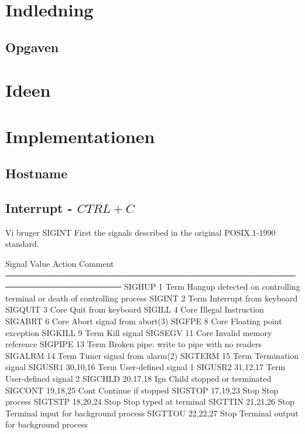 \documentclass{article}
\begin{document}

\tableofcontents
\pagebreak

\section{Indledning}

\subsection{Opgaven}

\section{Ideen}

\section{Implementationen}
\subsection{Hostname}

\subsection{Interrupt - $CTRL + C$}
Vi bruger SIGINT
 First the signals described in the original POSIX.1-1990 standard.

       Signal     Value     Action   Comment
       ──────────────────────────────────────────────────────────────────────
       SIGHUP        1       Term    Hangup detected on controlling terminal
                                     or death of controlling process
       SIGINT        2       Term    Interrupt from keyboard
       SIGQUIT       3       Core    Quit from keyboard
       SIGILL        4       Core    Illegal Instruction
       SIGABRT       6       Core    Abort signal from abort(3)
       SIGFPE        8       Core    Floating point exception
       SIGKILL       9       Term    Kill signal
       SIGSEGV      11       Core    Invalid memory reference
       SIGPIPE      13       Term    Broken pipe: write to pipe with no
                                     readers
       SIGALRM      14       Term    Timer signal from alarm(2)
       SIGTERM      15       Term    Termination signal
       SIGUSR1   30,10,16    Term    User-defined signal 1
       SIGUSR2   31,12,17    Term    User-defined signal 2
       SIGCHLD   20,17,18    Ign     Child stopped or terminated
       SIGCONT   19,18,25    Cont    Continue if stopped
       SIGSTOP   17,19,23    Stop    Stop process
       SIGTSTP   18,20,24    Stop    Stop typed at terminal
       SIGTTIN   21,21,26    Stop    Terminal input for background process
       SIGTTOU   22,22,27    Stop    Terminal output for background process
\end{document}
